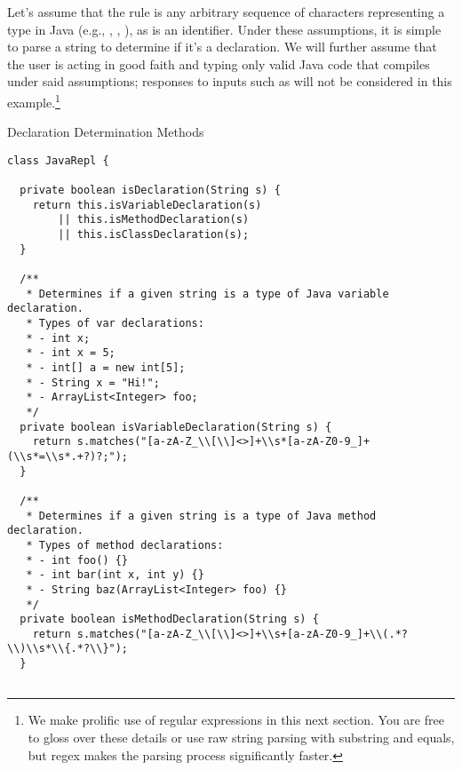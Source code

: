 Let's assume that the  rule is any arbitrary sequence of characters representing a type in Java (e.g., , , ), as is an identifier. Under these assumptions, it is simple to parse a string to determine if it's a declaration. We will further assume that the user is acting in good faith and typing only valid Java code that compiles under said assumptions; responses to inputs such as  will not be considered in this example.\footnote{We make prolific use of regular expressions in this next section. You are free to gloss over these details or use raw string parsing with substring and equals, but regex makes the parsing process significantly faster.}

\begin{cl}{Declaration Determination Methods}
\begin{lstlisting}[language=MyJava]
class JavaRepl {

  private boolean isDeclaration(String s) {
    return this.isVariableDeclaration(s)
        || this.isMethodDeclaration(s)
        || this.isClassDeclaration(s);
  }

  /**
   * Determines if a given string is a type of Java variable declaration.
   * Types of var declarations:
   * - int x;
   * - int x = 5;
   * - int[] a = new int[5];
   * - String x = "Hi!";
   * - ArrayList<Integer> foo;
   */
  private boolean isVariableDeclaration(String s) {
    return s.matches("[a-zA-Z_\\[\\]<>]+\\s*[a-zA-Z0-9_]+(\\s*=\\s*.+?)?;");
  }

  /**
   * Determines if a given string is a type of Java method declaration.
   * Types of method declarations:
   * - int foo() {}
   * - int bar(int x, int y) {}
   * - String baz(ArrayList<Integer> foo) {}
   */
  private boolean isMethodDeclaration(String s) {
    return s.matches("[a-zA-Z_\\[\\]<>]+\\s+[a-zA-Z0-9_]+\\(.*?\\)\\s*\\{.*?\\}");
  }


\end{lstlisting}
\end{cl}
